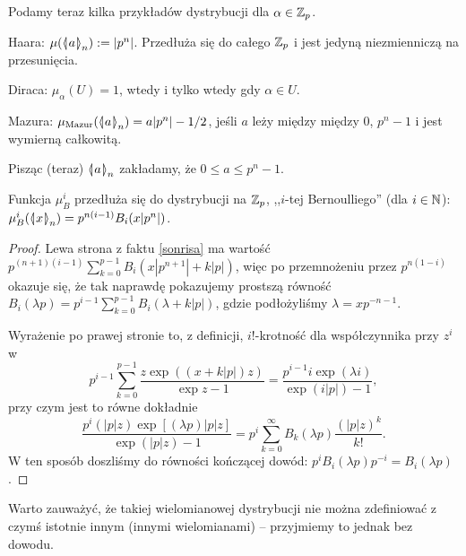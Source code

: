 Podamy teraz kilka przykładów dystrybucji dla $\alpha \in \mathbb Z_p$.
\begin{enumx}
	\item {Haara}: $\mu(\mathrel{\langle\mkern-3.85mu\mid\mkern-4mu} {a}\mathrel{\mkern-4mu\mid\mkern-3.85mu\rangle}_{n}) := |p^n|$.
	Przedłuża się do całego $\mathbb Z_p$ i jest jedyną niezmienniczą na przesunięcia.
	\item {Diraca}: $\mu_\alpha(U) = 1$, wtedy i tylko wtedy gdy $\alpha \in U$.
	\item {Mazura}: $\mu_{\textrm{Mazur}}(\mathrel{\langle\mkern-3.85mu\mid\mkern-4mu} {a}\mathrel{\mkern-4mu\mid\mkern-3.85mu\rangle}_{n}) = a|p^n| - 1/2$, jeśli $a$ leży między między $0$, $p^n - 1$ i jest wymierną całkowitą.
\end{enumx}

Pisząc (teraz) $\mathrel{\langle\mkern-3.85mu\mid\mkern-4mu} {a}\mathrel{\mkern-4mu\mid\mkern-3.85mu\rangle}_{n}$ zakładamy, że $0 \le a \le p^n - 1$.

\begin{fakt}
	Funkcja $\mu_{B}^i$ przedłuża się do dystrybucji na $\mathbb Z_p$, ,,$i$-tej  Bernoulliego'' (dla $i \in \mathbb N$): $\mu_{B}^i (\mathrel{\langle\mkern-3.85mu\mid\mkern-4mu} {x}\mathrel{\mkern-4mu\mid\mkern-3.85mu\rangle}_{n}) = p^{n(i-1)} B_i (x |p^n|)$.
\end{fakt}

\begin{proof}
	Lewa strona z faktu \ref{sonrisa} ma wartość $p^{(n+1)(i-1)} \sum_{k=0}^{p-1} B_i(x|p^{n+1}| + k|p|)$,
	więc po przemnożeniu przez $p^{n(1-i)}$ okazuje się, że tak naprawdę pokazujemy prostszą równość $B_i(\lambda p) = p^{i-1} \sum_{k=0}^{p-1} B_i(\lambda + k|p|)$, gdzie podłożyliśmy $\lambda = xp^{-n-1}$.
	
	Wyrażenie po prawej stronie to, z definicji, $i!$-krotność dla współczynnika przy $z^i$ w
	\[
		p^{i-1} \sum_{k = 0}^{p-1} \frac{z\exp((x + k|p|)z)}{\exp z - 1} = \frac{p^{i-1}i\exp (\lambda i)}{\exp (i|p|) - 1},
	\]
	przy czym jest to równe dokładnie
	\[
		\frac{p^i(|p|z)\exp[(\lambda p) |p| z]}{\exp(|p|z) - 1} = p^i \sum_{k=0}^\infty B_k(\lambda p) \frac{(|p| z)^k}{k!}.
	\]
	W ten sposób doszliśmy do równości kończącej dowód: $p^iB_i(\lambda p)p^{-i} = B_i(\lambda p)$.
\end{proof}

Warto zauważyć, że takiej wielomianowej dystrybucji nie można zdefiniować z czymś istotnie innym (innymi wielomianami) -- przyjmiemy to jednak bez dowodu.